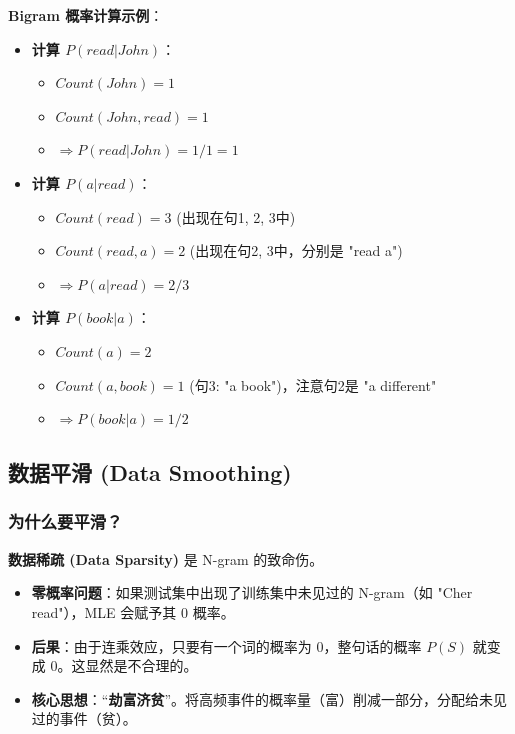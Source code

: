 \documentclass[a4paper, 11pt]{ctexart}
\begin{document}
\textbf{Bigram 概率计算示例}：
\begin{itemize}
    \item \textbf{计算 $P(read | John)$}：
    \begin{itemize}
        \item $Count(John) = 1$
        \item $Count(John, read) = 1$
        \item $\Rightarrow P(read|John) = 1/1 = 1$
    \end{itemize}
    \item \textbf{计算 $P(a | read)$}：
    \begin{itemize}
        \item $Count(read) = 3$ (出现在句1, 2, 3中)
        \item $Count(read, a) = 2$ (出现在句2, 3中，分别是 "read a")
        \item $\Rightarrow P(a|read) = 2/3$
    \end{itemize}
    \item \textbf{计算 $P(book | a)$}：
    \begin{itemize}
        \item $Count(a) = 2$
        \item $Count(a, book) = 1$ (句3: "a book")，注意句2是 "a different"
        \item $\Rightarrow P(book|a) = 1/2$
    \end{itemize}
\end{itemize}

\subsection{数据平滑 (Data Smoothing)}

\subsubsection{为什么要平滑？}
\textbf{数据稀疏 (Data Sparsity)} 是 N-gram 的致命伤。
\begin{itemize}
    \item \textbf{零概率问题}：如果测试集中出现了训练集中未见过的 N-gram（如 "Cher read"），MLE 会赋予其 0 概率。
    \item \textbf{后果}：由于连乘效应，只要有一个词的概率为 0，整句话的概率 $P(S)$ 就变成 0。这显然是不合理的。
    \item \textbf{核心思想}：“\textbf{劫富济贫}”。将高频事件的概率量（富）削减一部分，分配给未见过的事件（贫）。
\end{itemize}
\end{document}
